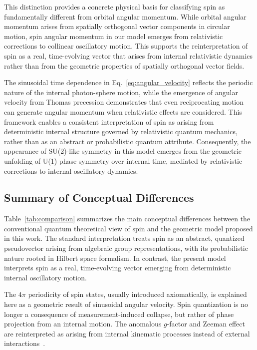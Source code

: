\documentclass[%
 reprint,
 amsmath,amssymb,
 aps,
]{revtex4-1}
\numberwithin{equation}{section}%
\begin{document}
This distinction provides a concrete physical basis for classifying spin as fundamentally different from orbital angular momentum. While orbital angular momentum arises from spatially orthogonal vector components in circular motion, spin angular momentum in our model emerges from relativistic corrections to collinear oscillatory motion. This supports the reinterpretation of spin as a real, time-evolving vector that arises from internal relativistic dynamics rather than from the geometric properties of spatially orthogonal vector fields.

The sinusoidal time dependence in Eq.~\ref{eq:angular_velocity} reflects the periodic nature of the internal photon-sphere motion, while the emergence of angular velocity from Thomas precession demonstrates that even reciprocating motion can generate angular momentum when relativistic effects are considered. This framework enables a consistent interpretation of spin as arising from deterministic internal structure governed by relativistic quantum mechanics, rather than as an abstract or probabilistic quantum attribute. Consequently, the appearance of SU(2)-like symmetry in this model emerges from the geometric unfolding of U(1) phase symmetry over internal time, mediated by relativistic corrections to internal oscillatory dynamics.


\subsection{Summary of Conceptual Differences}

Table~\ref{tab:comparison} summarizes the main conceptual differences between the conventional quantum theoretical view of spin and the geometric model proposed in this work. The standard interpretation treats spin as an abstract, quantized pseudovector arising from algebraic group representations, with its probabilistic nature rooted in Hilbert space formalism. In contrast, the present model interprets spin as a real, time-evolving vector emerging from deterministic internal oscillatory motion. 

The $4\pi$ periodicity of spin states, usually introduced axiomatically, is explained here as a geometric result of sinusoidal angular velocity. Spin quantization is no longer a consequence of measurement-induced collapse, but rather of phase projection from an internal motion. The anomalous $g$-factor and Zeeman effect are reinterpreted as arising from internal kinematic processes instead of external interactions~\cite{hanamura2501.0130}.
\end{document}
